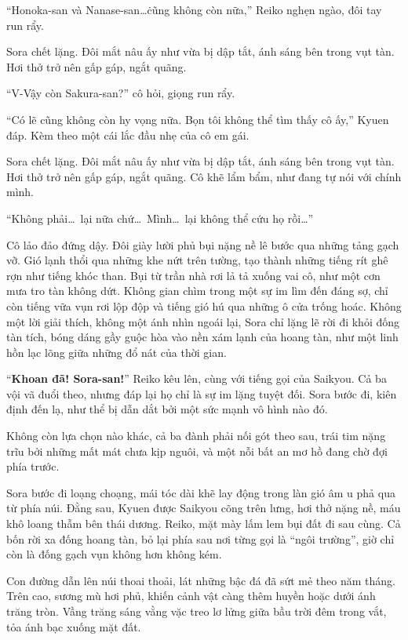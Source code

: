 \documentclass[../main.tex]{subfiles}
\begin{document}
``Honoka-san và Nanase-san\dots\. cũng không còn nữa,'' Reiko nghẹn ngào, đôi tay run rẩy.

Sora chết lặng. Đôi mắt nâu ấy như vừa bị dập tắt, ánh sáng bên trong vụt tàn. Hơi thở trở nên gấp gáp, ngắt quãng.

``V-Vậy còn Sakura-san?'' cô hỏi, giọng run rẩy.

``Có lẽ cũng không còn hy vọng nữa. Bọn tôi không thể tìm thấy cô ấy,'' Kyuen đáp. Kèm theo một cái lắc đầu nhẹ của cô em gái.

Sora chết lặng. Đôi mắt nâu ấy như vừa bị dập tắt, ánh sáng bên trong vụt tàn. Hơi thở trở nên gấp gáp, ngắt quãng. Cô khẽ lẩm bẩm, như đang tự nói với chính mình.

``Không phải\dots\ lại nữa chứ\dots\ Mình\dots\ lại không thể cứu họ rồi\dots''

Cô lảo đảo đứng dậy. Đôi giày lười phủ bụi nặng nề lê bước qua những tảng gạch vỡ. Gió lạnh thổi qua những khe nứt trên tường, tạo thành những tiếng rít ghê rợn như tiếng khóc than. Bụi từ trần nhà rơi lả tả xuống vai cô, như một cơn mưa tro tàn không dứt. Không gian chìm trong một sự im lìm đến đáng sợ, chỉ còn tiếng vữa vụn rơi lộp độp và tiếng gió hú qua những ô cửa trống hoác. Không một lời giải thích, không một ánh nhìn ngoái lại, Sora chỉ lặng lẽ rời đi khỏi đống tàn tích, bóng dáng gầy guộc hòa vào nền xám lạnh của hoang tàn, như một linh hồn lạc lõng giữa những đổ nát của thời gian.

``\textbf{Khoan đã! Sora-san!}'' Reiko kêu lên, cùng với tiếng gọi của Saikyou. Cả ba vội vã đuổi theo, nhưng đáp lại họ chỉ là sự im lặng tuyệt đối. Sora bước đi, kiên định đến lạ, như thể bị dẫn dắt bởi một sức mạnh vô hình nào đó.

Không còn lựa chọn nào khác, cả ba đành phải nối gót theo sau, trái tim nặng trĩu bởi những mất mát chưa kịp nguôi, và một nỗi bất an mơ hồ đang chờ đợi phía trước.

\ct

Sora bước đi loạng choạng, mái tóc dài khẽ lay động trong làn gió âm u phả qua từ phía núi. Đằng sau, Kyuen được Saikyou cõng trên lưng, hơi thở nặng nề, máu khô loang thẫm bên thái dương. Reiko, mặt mày lấm lem bụi đất đi sau cùng. Cả bốn rời xa đống hoang tàn, bỏ lại phía sau nơi từng gọi là ``ngôi trường'', giờ chỉ còn là đống gạch vụn không hơn không kém.

Con đường dẫn lên núi thoai thoải, lát những bậc đá đã sứt mẻ theo năm tháng. Trên cao, sương mù hơi phủ, khiến cảnh vật càng thêm huyền hoặc dưới ánh trăng tròn. Vầng trăng sáng vằng vặc treo lơ lửng giữa bầu trời đêm trong vắt, tỏa ánh bạc xuống mặt đất.
\end{document}
